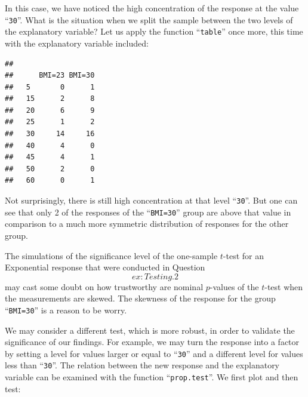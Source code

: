 \documentclass[
]{krantz}
\makeatletter
\newenvironment{Shaded}{\begin{snugshade}}{\end{snugshade}}
\newcommand{\DataTypeTok}[1]{\textcolor[rgb]{0.13,0.29,0.53}{#1}}
\newcommand{\DecValTok}[1]{\textcolor[rgb]{0.00,0.00,0.81}{#1}}
\newcommand{\KeywordTok}[1]{\textcolor[rgb]{0.13,0.29,0.53}{\textbf{#1}}}
\newcommand{\NormalTok}[1]{#1}
\newcommand{\OperatorTok}[1]{\textcolor[rgb]{0.81,0.36,0.00}{\textbf{#1}}}
\newenvironment{kframe}{%
\medskip{}
\setlength{\fboxsep}{.8em}
 \def\at@end@of@kframe{}%
 \ifinner\ifhmode%
  \def\at@end@of@kframe{\end{minipage}}%
  \begin{minipage}{\columnwidth}%
 \fi\fi%
 \def\FrameCommand##1{\hskip\@totalleftmargin \hskip-\fboxsep
 \colorbox{shadecolor}{##1}\hskip-\fboxsep
     \hskip-\linewidth \hskip-\@totalleftmargin \hskip\columnwidth}%
 \MakeFramed {\advance\hsize-\width
   \@totalleftmargin\z@ \linewidth\hsize
   \@setminipage}}%
 {\par\unskip\endMakeFramed%
 \at@end@of@kframe}
\renewenvironment{Shaded}{\begin{kframe}}{\end{kframe}}
\theoremstyle{definition}
\theoremstyle{definition}
\theoremstyle{definition}
\theoremstyle{remark}
\makeatother
\begin{document}
In this case, we have noticed the high concentration of the response at
the value ``\texttt{30}''. What is the situation when we split the sample between
the two levels of the explanatory variable? Let us apply the function
``\texttt{table}'' once more, this time with the explanatory variable included:

\begin{Shaded}
\end{Shaded}

\begin{verbatim}
##     
##      BMI=23 BMI=30
##   5       0      1
##   15      2      8
##   20      6      9
##   25      1      2
##   30     14     16
##   40      4      0
##   45      4      1
##   50      2      0
##   60      0      1
\end{verbatim}

Not surprisingly, there is still high concentration at that level
``\texttt{30}''. But one can see that only 2 of the responses of the ``\texttt{BMI=30}''
group are above that value in comparison to a much more symmetric
distribution of responses for the other group.

The simulations of the significance level of the one-sample \(t\)-test for
an Exponential response that were conducted in Question~\[ex:Testing.2\]
may cast some doubt on how trustworthy are nominal \(p\)-values of the
\(t\)-test when the measurements are skewed. The skewness of the response
for the group ``\texttt{BMI=30}'' is a reason to be worry.

We may consider a different test, which is more robust, in order to
validate the significance of our findings. For example, we may turn the
response into a factor by setting a level for values larger or equal to
``\texttt{30}'' and a different level for values less than ``\texttt{30}''. The relation
between the new response and the explanatory variable can be examined
with the function ``\texttt{prop.test}''. We first plot and then test:

\begin{Shaded}
\end{Shaded}
\end{document}
